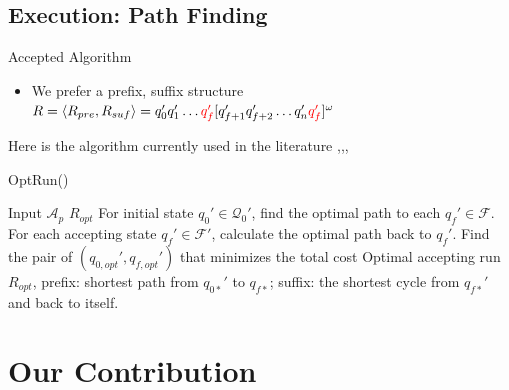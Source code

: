 \documentclass{beamer}
\newcommand{\F}{\mathcal{F}}
\newcommand{\Q}{\mathcal{Q}}
\newcommand{\A}{\mathcal{A}}
\begin{document}
\subsection{Execution: Path Finding}
\begin{frame}{Accepted Algorithm}
\begin{itemize}
\item {
	We prefer a prefix, suffix structure $R = \langle R_{pre}, R_{suf} \rangle = q_0' q_1' \dots {\color{red} q_f'} [ q_{f+1}' q_{f+2}' \dots q_n' {\color{red} q_f'}]^\omega$ 
}
\end{itemize}
Here is the algorithm currently used in the literature \cite{guo15},\cite{fainekos09},\cite{kloetzer08},\cite{smith2010}
\begin{algorithm}[H]
\caption{OptRun() \cite{guo15}}
\begin{algorithmic}[1]
\Require Input $\A_p$
\Ensure $R_{opt}$
\State For initial state $q_0' \in \Q_0'$, find the optimal path to each $q_f' \in \F$.
\State For each accepting state $q_f' \in \F'$, calculate the optimal path back to $q_f'$. 
\State Find the pair of $(q_{0,opt}',q_{f,opt}')$ that minimizes the total cost
\State Optimal accepting run $R_{opt}$, prefix: shortest path from $q_{0*}'$ to  $q_{f*}$; suffix: the shortest cycle from $q_{f*}'$ and back to itself.
\end{algorithmic}
\end{algorithm}
\end{frame}

\section{Our Contribution}
\end{document}
